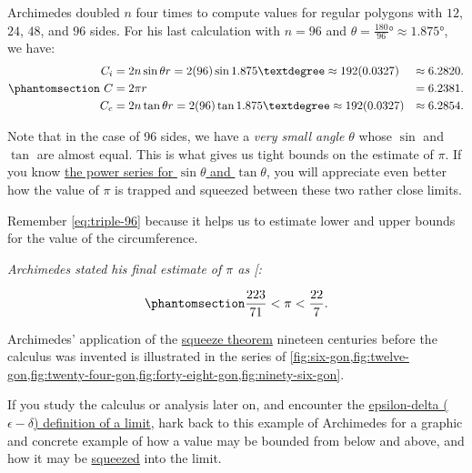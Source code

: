 \documentclass[
  a4paper,
]{article}
\begin{document}
Archimedes doubled \(n\) four times to compute values for regular
polygons with \(12\), \(24\), \(48\), and \(96\) sides. For his last
calculation with \(n = 96\) and
\(\theta = \tfrac{180}{96}° \approx 1.875°\), we have:
\begin{equation}\phantomsection\label{eq:triple-96}{
\begin{aligned}
C_i &= 2n\sin\theta r = 2(96)\sin{1.875°} \approx 192(0.0327) &\approx 6.2820.\\
C &= 2\pi r &= 6.2381.\\
C_c &= 2n\tan\theta r = 2(96)\tan{1.875°} \approx 192(0.0327) &\approx 6.2854.\\
\end{aligned}
}\end{equation}

Note that in the case of 96 sides, we have a \emph{very small angle}
\(\theta\) whose \(\sin\) and \(\tan\) are almost equal. This is what
gives us tight bounds on the estimate of \(\pi\). If you know
\href{https://math.libretexts.org/Bookshelves/Differential_Equations/A_First_Course_in_Differential_Equations_for_Scientists_and_Engineers_(Herman)/08:_Appendix_Calculus_Review/8.07:_Power_Series}{the
power series for \(\sin\theta\) and \(\tan\theta\)}, you will appreciate
even better how the value of \(\pi\) is trapped and squeezed between
these two rather close limits.

Remember \cref{eq:triple-96} because it helps us to estimate lower and
upper bounds for the value of the circumference.

\emph{Archimedes stated his final estimate of \(\pi\) as
{[}\citeproc{ref-heath2002}{4}{]}:}

\begin{equation}\phantomsection\label{eq:pi-estimate}{
\frac{223}{71} < \pi < \frac{22}{7}.
}\end{equation}

Archimedes' application of the
\href{https://en.wikipedia.org/wiki/Squeeze_theorem}{squeeze theorem}
nineteen centuries before the calculus was invented is illustrated in
the series of
\cref{fig:six-gon,fig:twelve-gon,fig:twenty-four-gon,fig:forty-eight-gon,fig:ninety-six-gon}.

If you study the calculus or analysis later on, and encounter the
\href{https://en.wikipedia.org/wiki/Limit_of_a_function}{epsilon-delta
(\(\epsilon-\delta\)) definition of a limit}, hark back to this example
of Archimedes for a graphic and concrete example of how a value may be
bounded from below and above, and how it may be
\href{https://demonstrations.wolfram.com/SqueezeTheorem/}{squeezed} into
the limit.
\end{document}
